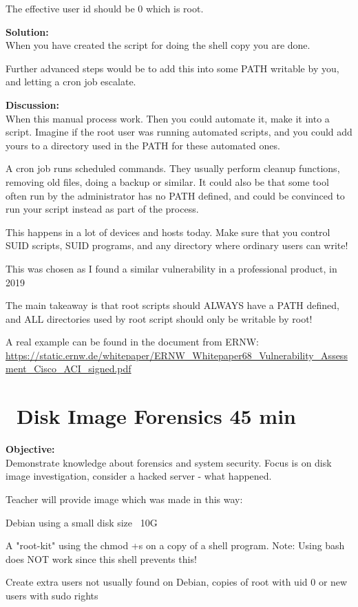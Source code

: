 \documentclass[a4paper,11pt,notitlepage]{report}
\begin{document}
The effective user id should be 0 which is root.


{\bf Solution:}\\
When you have created the script for doing the shell copy you are done.

Further advanced steps would be to add this into some PATH writable by you, and letting a cron job escalate.


{\bf Discussion:}\\
When this manual process work. Then you could automate it, make it into a script. Imagine if the root user was running automated scripts, and you could add yours to a directory used in the PATH for these automated ones.

A cron job runs scheduled commands. They usually perform cleanup functions, removing old files, doing a backup or similar. It could also be that some tool often run by the administrator has no PATH defined, and could be convinced to run your script instead as part of the process.

This happens in a lot of devices and hosts today. Make sure that you control SUID scripts, SUID programs, and any directory where ordinary users can write!

This was chosen as I found a similar vulnerability in a professional product, in 2019

The main takeaway is that root scripts should ALWAYS have a PATH defined, and ALL directories used by root script should only be writable by root!

A real example can be found in the document from ERNW: \\
{\small\url{https://static.ernw.de/whitepaper/ERNW_Whitepaper68_Vulnerability_Assessment_Cisco_ACI_signed.pdf}}

\chapter{\faExclamationTriangle\ Disk Image Forensics 45 min}
\label{ex:disk-image-forensics}

{\bf Objective:}\\
Demonstrate knowledge about forensics and system security. Focus is on disk image investigation, consider a hacked server - what happened.

Teacher will provide image which was made in this way:
\begin{list2}
\item Debian using a small disk size ~10G
\item A "root-kit" using the chmod +s on a copy of a shell program. Note: Using bash does NOT work since this shell prevents this!
\item Create extra users not usually found on Debian, copies of root with uid 0 or new users with sudo rights
\end{list2}
\end{document}
